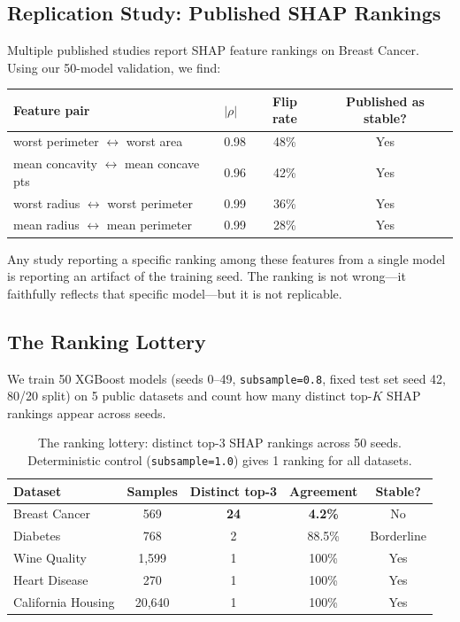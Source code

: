 \documentclass{article}
\begin{document}
\subsection{Replication Study: Published SHAP Rankings}

Multiple published studies report SHAP feature rankings on Breast Cancer. Using our 50-model validation, we find:

\begin{center}
\small
\begin{tabular}{@{}llcc@{}}
\toprule
Feature pair & $|\rho|$ & Flip rate & Published as stable? \\
\midrule
worst perimeter $\leftrightarrow$ worst area & 0.98 & 48\% & Yes \\
mean concavity $\leftrightarrow$ mean concave pts & 0.96 & 42\% & Yes \\
worst radius $\leftrightarrow$ worst perimeter & 0.99 & 36\% & Yes \\
mean radius $\leftrightarrow$ mean perimeter & 0.99 & 28\% & Yes \\
\bottomrule
\end{tabular}
\end{center}

Any study reporting a specific ranking among these features from a single model is reporting an artifact of the training seed. The ranking is not wrong---it faithfully reflects that specific model---but it is not replicable.

\subsection{The Ranking Lottery}
\label{sec:ranking-lottery}

We train 50 XGBoost models (seeds 0--49, \texttt{subsample=0.8}, fixed test set seed 42, 80/20 split) on 5 public datasets and count how many distinct top-$K$ SHAP rankings appear across seeds.

\begin{table}[t]
\centering
\caption{The ranking lottery: distinct top-3 SHAP rankings across 50 seeds. Deterministic control (\texttt{subsample=1.0}) gives 1 ranking for all datasets.}
\label{tab:ranking-lottery}
\small
\begin{tabular}{@{}lcccc@{}}
\toprule
Dataset & Samples & Distinct top-3 & Agreement & Stable? \\
\midrule
Breast Cancer & 569 & \textbf{24} & \textbf{4.2\%} & No \\
Diabetes & 768 & 2 & 88.5\% & Borderline \\
Wine Quality & 1,599 & 1 & 100\% & Yes \\
Heart Disease & 270 & 1 & 100\% & Yes \\
California Housing & 20,640 & 1 & 100\% & Yes \\
\bottomrule
\end{tabular}
\end{table}
\end{document}
